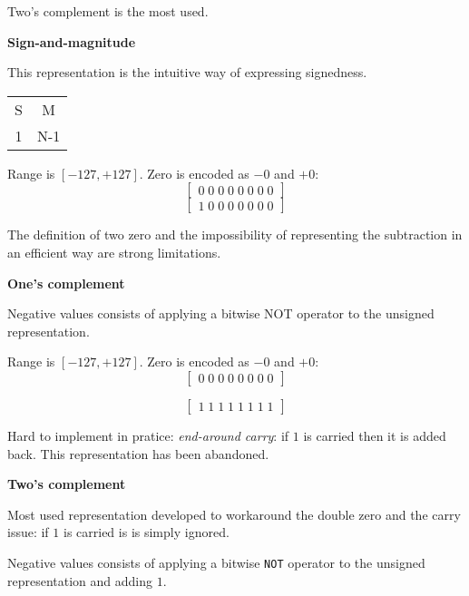 \documentclass{article}
\begin{document}
Two's complement is the most used.

\textbf{Sign-and-magnitude}

This representation is the intuitive way of expressing signedness.

\begin{tabular}{cc}
S & M \\
1 & N-1
\end{tabular}

Range is $[-127, +127]$.
Zero is encoded as $-0$ and $+0$:
\begin{equation*}
\begin{bmatrix}0\;0\;0\;0\;0\;0\;0\;0 \end{bmatrix}
\end{equation*}
\begin{equation*}
\begin{bmatrix}1\;0\;0\;0\;0\;0\;0\;0 \end{bmatrix}
\end{equation*}

The definition of two zero and the impossibility of representing the subtraction in an efficient way are strong limitations.

\textbf{One's complement}

Negative values consists of applying a bitwise NOT operator to the unsigned representation.

Range is $[-127, +127]$.
Zero is encoded as $-0$ and $+0$:
\begin{equation*}
\begin{bmatrix}0\;0\;0\;0\;0\;0\;0\;0 \end{bmatrix}
\end{equation*}

\begin{equation*}
\begin{bmatrix}1\;1\;1\;1\;1\;1\;1\;1 \end{bmatrix}
\end{equation*}

Hard to implement in pratice: \textit{end-around carry}: if $1$ is carried then it is added back. This representation has been abandoned.

\textbf{Two's complement}

Most used representation developed to workaround the double zero and the carry issue: if $1$ is carried is is simply ignored.

Negative values consists of applying a bitwise \texttt{NOT} operator to the unsigned representation and adding $1$.
\end{document}
